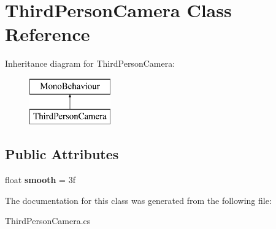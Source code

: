 \hypertarget{class_third_person_camera}{\section{Third\-Person\-Camera Class Reference}
\label{class_third_person_camera}
}
Inheritance diagram for Third\-Person\-Camera\-:\begin{figure}[H]
\begin{center}
\leavevmode
\includegraphics[height=2.000000cm]{class_third_person_camera}
\end{center}
\end{figure}
\subsection*{Public Attributes}
\begin{DoxyCompactItemize}
\item 
\hypertarget{class_third_person_camera_a93dee71af7573bcb3c3f86f39f636c72}{float {\bfseries smooth} = 3f}\label{class_third_person_camera_a93dee71af7573bcb3c3f86f39f636c72}

\end{DoxyCompactItemize}


The documentation for this class was generated from the following file\-:\begin{DoxyCompactItemize}
\item 
Third\-Person\-Camera.\-cs\end{DoxyCompactItemize}
